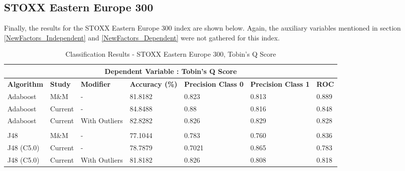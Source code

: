 \subsection*{STOXX Eastern Europe 300}
{Finally, the results for the STOXX Eastern Europe 300 index are shown below. Again, the auxiliary variables mentioned in section \ref{NewFactors_Independent} and \ref{NewFactors_Dependent} were not gathered for this index.}
\begin{table}[h!]
\centering
\begin{sideways}%
\begin{tabular}{ |p{2.1cm}|p{1.4cm}|p{2.5cm}||p{1.9cm}|p{1.8cm}|p{1.8cm}|p{1cm}|  }
 \hline
 \multicolumn{7}{|c|}{\bf Dependent Variable : Tobin's Q Score} \\
 \hline
 {\bf Algorithm} & {\bf Study} & {\bf Modifier} & {\bf Accuracy (\%)} & {\bf Precision Class 0} & {\bf Precision Class 1} & {\bf ROC} \\
 \hline
  Adaboost  & M\&M & - &  81.8182     & 0.823 &  0.813 & 0.889  \\
  \rowcolor{gray} Adaboost  & Current & - &84.8488  & 0.88  & 0.816 & 0.848 \\
  Adaboost  & Current & With Outliers &82.8282  & 0.826 & 0.829  & 0.828  \\
 & & & & & & \\
   \rowcolor{gray}J48  & M\&M & - &77.1044  & 0.783 &  0.760 & 0.836  \\
  J48 (C5.0) & Current & - &78.7879  & 0.7021 & 0.865  & 0.783  \\
  \rowcolor{gray} J48 (C5.0) & Current & With Outliers &81.8182  & 0.826  & 0.808  &  0.818 \\
 \hline
\end{tabular}
\end{sideways}
\caption{Classification Results - STOXX Eastern Europe 300, Tobin's Q Score}
\end{table}

